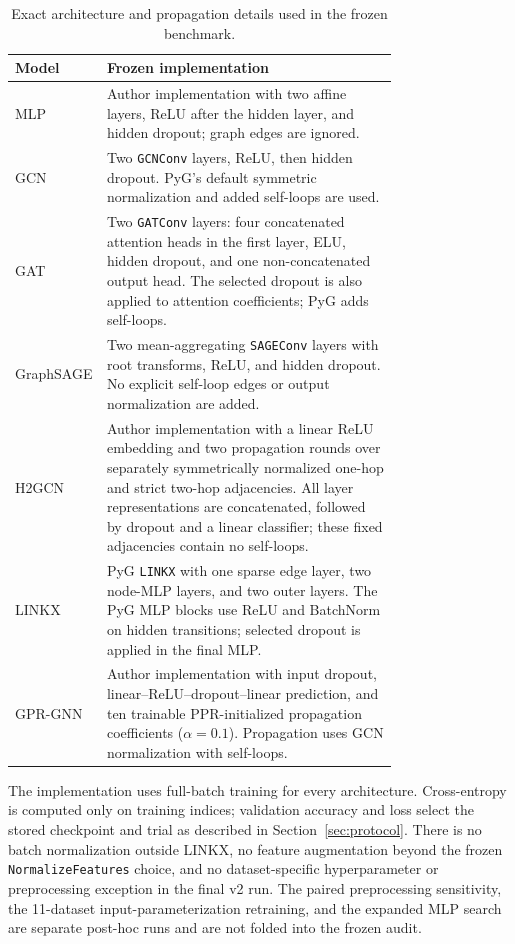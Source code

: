 \begin{table}[ht]
\centering
\caption{Exact architecture and propagation details used in the frozen benchmark.}
\label{tab:architecture_details}
\small
\begin{tabular}{@{}lp{0.76\linewidth}@{}}
\toprule
Model & Frozen implementation \\
\midrule
MLP & Author implementation with two affine layers, ReLU after the hidden layer, and hidden dropout; graph edges are ignored. \\
GCN & Two \texttt{GCNConv} layers, ReLU, then hidden dropout. PyG's default symmetric normalization and added self-loops are used. \\
GAT & Two \texttt{GATConv} layers: four concatenated attention heads in the first layer, ELU, hidden dropout, and one non-concatenated output head. The selected dropout is also applied to attention coefficients; PyG adds self-loops. \\
GraphSAGE & Two mean-aggregating \texttt{SAGEConv} layers with root transforms, ReLU, and hidden dropout. No explicit self-loop edges or output normalization are added. \\
H2GCN & Author implementation with a linear ReLU embedding and two propagation rounds over separately symmetrically normalized one-hop and strict two-hop adjacencies. All layer representations are concatenated, followed by dropout and a linear classifier; these fixed adjacencies contain no self-loops. \\
LINKX & PyG \texttt{LINKX} with one sparse edge layer, two node-MLP layers, and two outer layers. The PyG MLP blocks use ReLU and BatchNorm on hidden transitions; selected dropout is applied in the final MLP. \\
GPR-GNN & Author implementation with input dropout, linear--ReLU--dropout--linear prediction, and ten trainable PPR-initialized propagation coefficients ($\alpha=0.1$). Propagation uses GCN normalization with self-loops. \\
\bottomrule
\end{tabular}
\end{table}

The implementation uses full-batch training for every architecture. Cross-entropy is computed only on training indices; validation accuracy and loss select the stored checkpoint and trial as described in Section~\ref{sec:protocol}. There is no batch normalization outside LINKX, no feature augmentation beyond the frozen \texttt{NormalizeFeatures} choice, and no dataset-specific hyperparameter or preprocessing exception in the final v2 run. The paired preprocessing sensitivity, the 11-dataset input-parameterization retraining, and the expanded MLP search are separate post-hoc runs and are not folded into the frozen audit.
